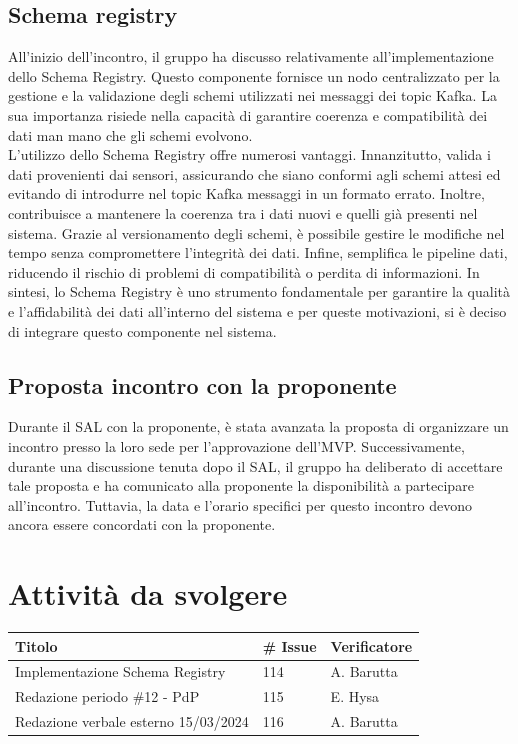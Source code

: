 \documentclass{article}
\begin{document}
\subsection{Schema registry}
All’inizio dell’incontro, il gruppo ha discusso relativamente all’implementazione dello Schema Registry. Questo componente fornisce un nodo centralizzato per la gestione e la validazione degli schemi utilizzati nei messaggi dei topic Kafka. La sua importanza risiede nella capacità di garantire coerenza e compatibilità dei dati man mano che gli schemi evolvono. \\
L’utilizzo dello Schema Registry offre numerosi vantaggi. Innanzitutto, valida i dati provenienti dai sensori, assicurando che siano conformi agli schemi attesi ed evitando di introdurre nel topic Kafka messaggi in un formato errato. Inoltre, contribuisce a mantenere la coerenza tra i dati nuovi e quelli già presenti nel sistema. Grazie al versionamento degli schemi, è possibile gestire le modifiche nel tempo senza compromettere l’integrità dei dati. Infine, semplifica le pipeline dati, riducendo il rischio di problemi di compatibilità o perdita di informazioni.
In sintesi, lo Schema Registry è uno strumento fondamentale per garantire la qualità e l’affidabilità dei dati all’interno del sistema e per queste motivazioni, si è deciso di integrare questo componente nel sistema.

\subsection{Proposta incontro con la proponente}
Durante il SAL con la proponente, è stata avanzata la proposta di organizzare un incontro presso la loro sede per l’approvazione dell’MVP. Successivamente, durante una discussione tenuta dopo il SAL, il gruppo ha deliberato di accettare tale proposta e ha comunicato alla proponente la disponibilità a partecipare all’incontro. Tuttavia, la data e l’orario specifici per questo incontro devono ancora essere concordati con la proponente. 

\section{Attività da svolgere}
\begin{center}
    \begin{tabular}{|C{7cm}|C{1,5cm}|C{3cm}|}
        \hline
        \textbf{Titolo} & \textbf{\# Issue} & \textbf{Verificatore} \\
        \hline
        \hline
        Implementazione Schema Registry & 114 & A. Barutta \\
        \hline
        Redazione periodo \#12 - PdP & 115 & E. Hysa \\
        \hline
        Redazione verbale esterno 15/03/2024 & 116 & A. Barutta \\
        \hline
    \end{tabular}
\end{center}
\end{document}

